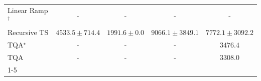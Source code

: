 \begin{tabular}{l|cccc|}
Linear Ramp$^\dagger$ & {\cellcolor[HTML]{000000}} \color[HTML]{F1F1F1} {\cellcolor{white}} \color{black} - & {\cellcolor[HTML]{000000}} \color[HTML]{F1F1F1} {\cellcolor{white}} \color{black} - & {\cellcolor[HTML]{000000}} \color[HTML]{F1F1F1} {\cellcolor{white}} \color{black} - & {\cellcolor[HTML]{000000}} \color[HTML]{F1F1F1} {\cellcolor{white}} \color{black} - \\
Recursive TS & {\cellcolor[HTML]{9FBAD9}} \color[HTML]{000000} $4533.5\pm 714.4$ & {\cellcolor[HTML]{F5EEF6}} \color[HTML]{000000} $1991.6\pm 0.0$ & {\cellcolor[HTML]{023F64}} \color[HTML]{F1F1F1} $9066.1\pm 3849.1$ & {\cellcolor[HTML]{0566A0}} \color[HTML]{F1F1F1} $7772.1\pm 3092.2$ \\
TQA$^\star$ & {\cellcolor[HTML]{000000}} \color[HTML]{F1F1F1} {\cellcolor{white}} \color{black} - & {\cellcolor[HTML]{000000}} \color[HTML]{F1F1F1} {\cellcolor{white}} \color{black} - & {\cellcolor[HTML]{000000}} \color[HTML]{F1F1F1} {\cellcolor{white}} \color{black} - & {\cellcolor[HTML]{CDD0E5}} \color[HTML]{000000} $3476.4$ \\
TQA & {\cellcolor[HTML]{000000}} \color[HTML]{F1F1F1} {\cellcolor{white}} \color{black} - & {\cellcolor[HTML]{000000}} \color[HTML]{F1F1F1} {\cellcolor{white}} \color{black} - & {\cellcolor[HTML]{000000}} \color[HTML]{F1F1F1} {\cellcolor{white}} \color{black} - & {\cellcolor[HTML]{D3D4E7}} \color[HTML]{000000} $3308.0$ \\
\cline{1-5}
\bottomrule
\end{tabular}
